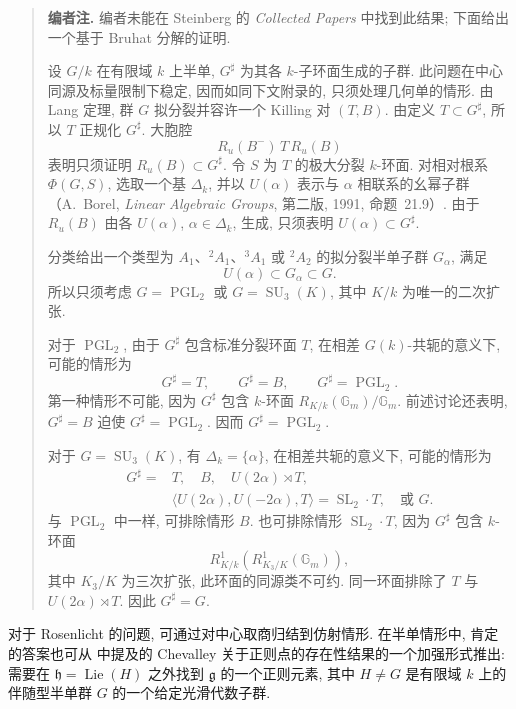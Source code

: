 \begin{quote}\small
\textbf{编者注.}
编者未能在 Steinberg 的 \emph{Collected Papers} 中找到此结果; 下面给出一个基于 Bruhat 分解的证明.

设 \(G/k\) 在有限域 \(k\) 上半单, \(G^\sharp\) 为其各 \(k\)-子环面生成的子群. 此问题在中心同源及标量限制下稳定, 因而如同下文附录的, 只须处理几何单的情形. 由 Lang 定理, 群 \(G\) 拟分裂并容许一个 Killing 对 \((T,B)\). 由定义 \(T\subset G^\sharp\), 所以 \(T\) 正规化 \(G^\sharp\). 大胞腔
\[
  R_u(B^-)\,T\,R_u(B)
\]
表明只须证明 \(R_u(B)\subset G^\sharp\). 令 \(S\) 为 \(T\) 的极大分裂 \(k\)-环面. 对相对根系 \(\Phi(G,S)\), 选取一个基 \(\Delta_k\), 并以 \(U(\alpha)\) 表示与 \(\alpha\) 相联系的幺幂子群\textup{（A.~Borel, \emph{Linear Algebraic Groups}, 第二版, 1991, 命题~21.9）}. 由于 \(R_u(B)\) 由各 \(U(\alpha)\), \(\alpha\in\Delta_k\), 生成, 只须表明 \(U(\alpha)\subset G^\sharp\).

分类给出一个类型为 \(A_1\)、\({}^{2}A_1\)、\({}^{3}A_1\) 或 \({}^{2}A_2\) 的拟分裂半单子群 \(G_\alpha\), 满足
\[
  U(\alpha)\subset G_\alpha\subset G.
\]
所以只须考虑 \(G=\operatorname{PGL}_2\) 或 \(G=\operatorname{SU}_3(K)\), 其中 \(K/k\) 为唯一的二次扩张.

对于 \(\operatorname{PGL}_2\), 由于 \(G^\sharp\) 包含标准分裂环面 \(T\), 在相差 \(G(k)\)-共轭的意义下, 可能的情形为
\[
  G^\sharp=T,\qquad G^\sharp=B,\qquad
  G^\sharp=\operatorname{PGL}_2.
\]
第一种情形不可能, 因为 \(G^\sharp\) 包含 \(k\)-环面 \(R_{K/k}(\mathbb G_m)/\mathbb G_m\). 前述讨论还表明, \(G^\sharp=B\) 迫使 \(G^\sharp=\operatorname{PGL}_2\). 因而 \(G^\sharp=\operatorname{PGL}_2\).

对于 \(G=\operatorname{SU}_3(K)\), 有 \(\Delta_k=\{\alpha\}\), 在相差共轭的意义下, 可能的情形为
\[
 \begin{split}
  G^\sharp={}&T,\quad B,\quad U(2\alpha)\rtimes T,\\
             &\langle U(2\alpha),U(-2\alpha),T\rangle
               =\operatorname{SL}_2\cdot T,\quad\text{或 }G.
 \end{split}
\]
与 \(\operatorname{PGL}_2\) 中一样, 可排除情形 \(B\). 也可排除情形 \(\operatorname{SL}_2\cdot T\), 因为 \(G^\sharp\) 包含 \(k\)-环面
\[
  R^1_{K/k}\!\left(R^1_{K_3/K}(\mathbb G_m)\right),
\]
其中 \(K_3/K\) 为三次扩张, 此环面的同源类不可约. 同一环面排除了 \(T\) 与 \(U(2\alpha)\rtimes T\). 因此 \(G^\sharp=G\).
\end{quote}

对于 Rosenlicht 的问题, 可通过对中心取商归结到仿射情形. 在半单情形中, 肯定的答案也可从  中提及的 Chevalley 关于正则点的存在性结果的一个加强形式推出: 需要在 \(\mathfrak h=\operatorname{Lie}(H)\) 之外找到 \(\mathfrak g\) 的一个正则元素, 其中 \(H\ne G\) 是有限域 \(k\) 上的伴随型半单群 \(G\) 的一个给定光滑代数子群.

